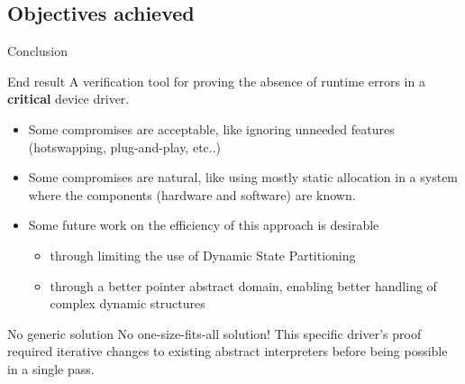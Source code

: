 \documentclass[aspectratio=169]{beamer}
\begin{document}
\subsection{Objectives achieved}
\begin{frame}{Conclusion}
  \begin{exampleblock}{End result}
    A verification tool for proving the absence of runtime errors in a \textbf{critical} device driver.
    \begin{itemize}
    \item Some compromises are acceptable, like ignoring unneeded features (hotswapping, plug-and-play, etc..)
    \item Some compromises are natural, like using mostly static allocation in a system where the components (hardware and software) are known.
    \item Some future work on the efficiency of this approach is desirable
      \begin{itemize}
      \item through limiting the use of Dynamic State Partitioning
      \item through a better pointer abstract domain, enabling better handling of complex dynamic structures
      \end{itemize}
    \end{itemize}
  \end{exampleblock}
  \begin{alertblock}{No generic solution}
    No one-size-fits-all solution! This specific driver's proof required iterative changes to existing abstract interpreters before being possible in a single pass.
  \end{alertblock}
\end{frame}
\end{document}
